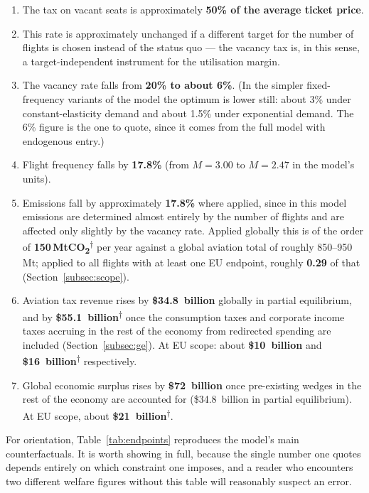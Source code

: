 \documentclass[11pt]{article}
\newcommand{\derived}{\textsuperscript{$\dagger$}}
\begin{document}
\begin{enumerate}
  \item The tax on vacant seats is approximately \textbf{50\% of the average
  ticket price}.
  \item\label{item:robustrate} This rate is approximately unchanged if a
  different target for the number of flights is chosen instead of the status quo
  --- the vacancy tax is, in this sense, a target-independent instrument for the
  utilisation margin.
  \item The vacancy rate falls from \textbf{20\% to about 6\%}. (In the simpler
  fixed-frequency variants of the model the optimum is lower still: about 3\%
  under constant-elasticity demand and about 1.5\% under exponential demand.
  The 6\% figure is the one to quote, since it comes from the full model with
  endogenous entry.)
  \item Flight frequency falls by \textbf{17.8\%} (from $M=3.00$ to $M=2.47$ in
  the model's units).
  \item Emissions fall by approximately \textbf{17.8\%} where applied, since in
  this model emissions are determined almost entirely by the number of flights
  and are affected only slightly by the vacancy rate. Applied globally this is
  of the order of \textbf{150\,MtCO\textsubscript{2}}\derived{} per year against
  a global aviation total of roughly 850--950\,Mt; applied to all flights with
  at least one EU endpoint, roughly \textbf{0.29} of that
  (Section~\ref{subsec:scope}).
  \item Aviation tax revenue rises by \textbf{\$34.8~billion} globally in
  partial equilibrium, and by \textbf{\$55.1~billion}\derived{} once the
  consumption taxes and corporate income taxes accruing in the rest of the
  economy from redirected spending are included
  (Section~\ref{subsec:ge}). At EU scope: about \textbf{\$10~billion} and
  \textbf{\$16~billion}\derived{} respectively.
  \item Global economic surplus rises by \textbf{\$72~billion} once pre-existing
  wedges in the rest of the economy are accounted for (\$34.8~billion in partial
  equilibrium). At EU scope, about \textbf{\$21~billion}\derived{}.
\end{enumerate}

For orientation, Table~\ref{tab:endpoints} reproduces the model's main
counterfactuals. It is worth showing in full, because the single number one
quotes depends entirely on which constraint one imposes, and a reader who
encounters two different welfare figures without this table will reasonably
suspect an error.
\end{document}
